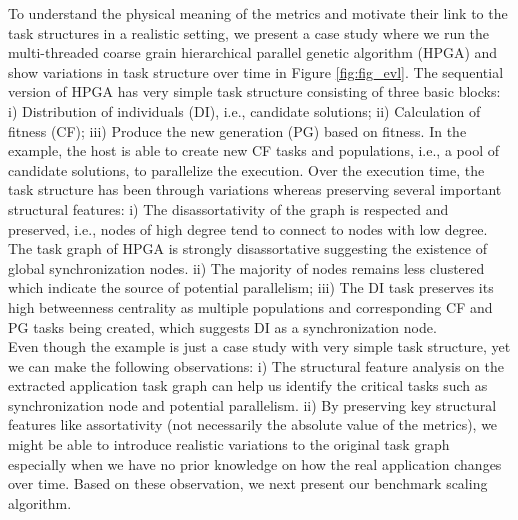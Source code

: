 \indent To understand the physical meaning of the metrics and motivate their link to the task structures in a realistic setting, we present a case study where we run the multi-threaded coarse grain hierarchical parallel genetic algorithm (HPGA)  and show variations in task structure over time in Figure \ref{fig:fig_evl}. The sequential version of HPGA has very simple  task structure consisting of three basic blocks: i) Distribution of individuals (DI), i.e., candidate solutions; ii) Calculation of fitness (CF); iii) Produce the new generation (PG) based on fitness. In the example, the host is able to create new CF tasks and populations, i.e., a pool of candidate solutions, to parallelize the execution. Over the execution time, the task structure has been through variations whereas preserving several important structural features: i) The disassortativity of the graph is respected and preserved, i.e., nodes of high degree tend to connect to nodes with low degree. The task graph of HPGA is strongly disassortative suggesting the existence of global synchronization nodes. ii) The majority of nodes remains less clustered which indicate the source of potential parallelism; iii) The DI task preserves its high betweenness centrality as multiple populations and corresponding CF and PG tasks being created, which suggests DI as a synchronization node.\\
\indent  Even though the example is just a case study with very simple task structure, yet we can make the following observations: i) The structural feature analysis on the extracted application task graph can help us identify the critical tasks such as synchronization node and potential parallelism. ii) By preserving key structural features like assortativity (not necessarily the absolute value of the metrics), we might be able to introduce realistic variations to the original task graph especially when we have no prior knowledge on how the real application changes over time. Based on these observation, we next present our benchmark scaling algorithm.
